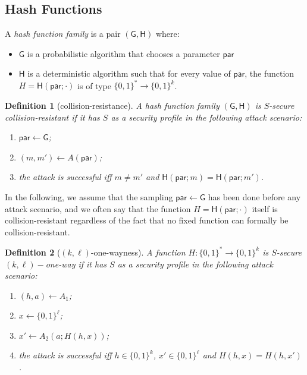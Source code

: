 \documentclass{article}
\newtheorem{definition}{Definition}[section]
\newcommand{\bits}[1]{\{0,1\}^{#1}}
\newcommand{\hfgen}[0]{\mathsf{G}} %
\newcommand{\hfunc}[0]{\mathsf{H}} %
\newcommand{\param}[0]{\mathsf{par}}
\begin{document}
\subsection{Hash Functions}

\noindent A \emph{hash function family} is a pair $(\hfgen,\hfunc)$ where:
\begin{itemize}
\item $\hfgen$ is a probabilistic algorithm that chooses a parameter $\param$
\item $\hfunc$ is a deterministic algorithm such that for every value of $\param$, the function $H=\hfunc(\param; \cdot)$ is of type $\bits{\ast} \to \bits{k}$.
\end{itemize}

\begin{definition}[collision-resistance]
A hash function family $(\hfgen,\hfunc)$ is $S$-secure collision-resistant if it has $S$ as a security profile in the following attack scenario:
\begin{enumerate}
\item $\param \gets \hfgen$;
\item $(m,m')\gets A(\param)$;
\item the attack is successful iff $m\neq m'$ and $\hfunc(\param;m)=\hfunc(\param;m')$.
\end{enumerate}
\end{definition}

\noindent In the following, we assume that the sampling $\param \gets \hfgen$ has been done before any attack scenario, and we often say that the function $H=\hfunc(\param; \cdot)$ itself is collision-resistant regardless of the fact that no fixed function can formally be collision-resistant.

\begin{definition}[$(k,\ell)$-one-wayness]
A function $H\colon \{0,1\}^\ast\rightarrow\{0,1\}^k$
is $S$-secure $(k,\ell)-$\emph{one-way} if it has $S$ as a security profile in the following attack scenario:
\begin{enumerate}
\item $(h,a)\gets A_1$;
\item $x \gets \{0,1\}^\ell$;
\item $x'\gets A_2(a;H(h,x))$;
\item the attack is successful iff $h\in\{0,1\}^k$, $x'\in\{0,1\}^\ell$ and $H(h,x)=H(h,x')$.
\end{enumerate}
\end{definition}
\end{document}
